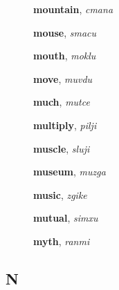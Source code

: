 \documentclass[12pt]{book}
\begin{document}
\begin{description}
\item[ ] \textbf{mountain}, \textit{cmana}

\item[ ] \textbf{mouse}, \textit{smacu}

\item[ ] \textbf{mouth}, \textit{moklu}

\item[ ] \textbf{move}, \textit{muvdu}

\item[ ] \textbf{much}, \textit{mutce}

\item[ ] \textbf{multiply}, \textit{pilji}

\item[ ] \textbf{muscle}, \textit{sluji}

\item[ ] \textbf{museum}, \textit{muzga}

\item[ ] \textbf{music}, \textit{zgike}

\item[ ] \textbf{mutual}, \textit{simxu}

\item[ ] \textbf{myth}, \textit{ranmi}



\end{description}



\subsection{N} %
\end{document}

